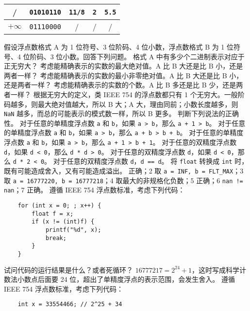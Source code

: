\begin{problems}
\begin{table}[H]
\begin{tabular}{|c|c|c|c|c|}
                / & \verb|01010110| & \verb|11/8| & \verb|2| & \texttt{5.5} \\ \hline
                $+\infty$ & \verb|01110000| & / & / & / \\ \hline
            \end{tabular}
        \end{table}
        \pro 假设浮点数格式 A 为 1 位符号、3 位阶码、4 位小数，浮点数格式 B 为 1 位符号、4 位阶码、3 位小数。回答下列问题。
            \qn 格式 A 中有多少个二进制表示对应于正无穷大？
            \qn 考虑能精确表示的实数的最大绝对值。A 比 B 大还是比 B 小，还是两者一样？
            \qn 考虑能精确表示的实数的最小非零绝对值。A 比 B 大还是比 B 小，还是两者一样？
            \qn 考虑能精确表示的实数的个数。A 比 B 多还是比 B 少，还是两者一样？
        \sol 根据无穷大的定义，类 IEEE 754 的浮点数都只有 1 个无穷大。一般阶码越多，则最大绝对值越大，所以 B 大；A 大，理由同前；小数长度越多，则 \verb|NaN| 越多，而总的可能表示的模式数一样，所以 B 更多。
        \pro 判断下列说法的正确性。
            \qn 对于任意的单精度浮点数 \texttt{a} 和 \texttt{b}，如果 \texttt{a > b}，那么 \texttt{a + 1 > b}。
            \qn 对于任意的单精度浮点数 \texttt{a} 和 \texttt{b}，如果 \texttt{a > b}，那么 \texttt{a + b > b + b}。
            \qn 对于任意的单精度浮点数 \texttt{a} 和 \texttt{b}，如果 \texttt{a > b}，那么 \texttt{a + 1 > b + 1}。
            \qn 对于任意的双精度浮点数 \texttt{d}，如果 \texttt{d < 0}，那么 \texttt{d * d > 0}。
            \qn 对于任意的双精度浮点数 \texttt{d}，如果 \texttt{d < 0}，那么 \texttt{d * 2 < 0}。
            \qn 对于任意的双精度浮点数 \texttt{d}，\texttt{d == d}。
            \qn 将 \texttt{float} 转换成 \texttt{int} 时，既有可能造成舍入，又有可能造成溢出。
         正确；2 取 \verb|a = INF, b = FLT_MAX|；3 取 \verb|a = 16777220, b = 16777218|；4 取最大的非规格化负数；5 正确；6 \verb|nan != nan|；7 正确。
        \pro 遵循 IEEE 754 浮点数标准，考虑下列代码：
        \begin{verbatim}
    for (int x = 0; ; x++) {
        float f = x;
        if (x != (int)f) {
            printf("%d", x);
            break;
        }
    }
        \end{verbatim}
        试问代码的运行结果是什么？或者死循环？
        \sol $16777217=2^{24}+1$，这时写成科学计数法小数点后面要 24 位，超出了单精度浮点的表示范围，会发生舍入。
        \pro 遵循 IEEE 754 浮点数标准，考虑下列代码：
        \begin{verbatim}
    int x = 33554466; // 2^25 + 34

\end{verbatim}
\end{problems}
